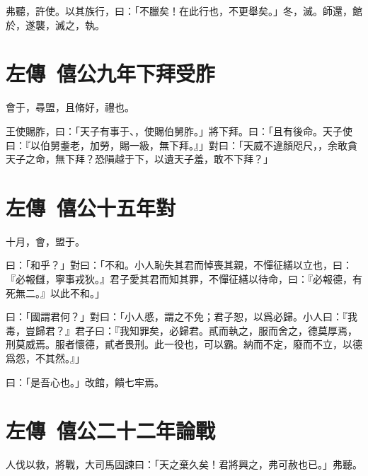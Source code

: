弗聽，許使。以其族行，曰：「不臘矣！在此行也，不更舉矣。」冬，滅。師還，館於，遂襲，滅之，執。

\theendnotes

\section[齊桓下拜受胙\quad{\small 左傳\ 僖公九年}]{{\normalsize 左傳\ 僖公九年}\quad {}下拜受胙}
會于，尋盟，且脩好，禮也。

王使賜胙，曰：「天子有事于、，使賜伯舅胙。」將下拜。曰：「且有後命。天子使曰：『以伯舅耋老，加勞，賜一級，無下拜。』」對曰：「天威不違顏咫尺，，余敢貪天子之命，無下拜？恐隕越于下，以遺天子羞，敢不下拜？」

\section[陰飴甥對秦伯\quad{\small 左傳\ 僖公十五年}]{{\normalsize 左傳\ 僖公十五年}\quad {}對}
十月，會，盟于。

曰：「和乎？」對曰：「不和。小人恥失其君而悼喪其親，不憚征繕以立也，曰：『必報讎，寧事戎狄。』君子愛其君而知其罪，不憚征繕以待命，曰：『必報德，有死無二。』以此不和。」

曰：「國謂君何？」對曰：「小人慼，謂之不免；君子恕，以爲必歸。小人曰：『我毒，豈歸君？』君子曰：『我知罪矣，必歸君。貳而執之，服而舍之，德莫厚焉，刑莫威焉。服者懷德，貳者畏刑。此一役也，可以霸。納而不定，廢而不立，以德爲怨，不其然。』」

曰：「是吾心也。」改館，饋七牢焉。

\section[子魚論戰\quad{\small 左傳\ 僖公二十二年}]{{\normalsize 左傳\ 僖公二十二年}\quad {}論戰}
人伐以救，將戰，大司馬固諫曰：「天之棄久矣！君將興之，弗可赦也已。」弗聽。


